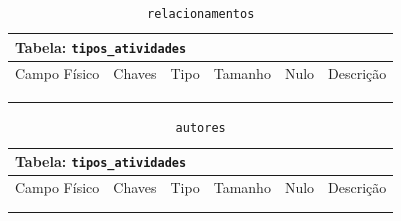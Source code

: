 \documentclass[12pt,a4paper]{article}
\begin{document}
\begin{center}
\begin{table}[h!]
	\caption{\texttt{relacionamentos}}
	\label{tabela:relacionamentos}
	\begin{tabular}{|p{2.5cm}|p{1cm}|p{1.25cm}|p{1.75cm}|p{1.25cm}|p{5cm}|}\hline	
		\multicolumn{6}{|p{16cm}|}{\cellcolor{cinzaClaro}  \centering Tabela: \texttt{tipos\_atividades}} \\ \hline %
		{\small Campo Físico}   & {\small Chaves} & {\small Tipo} & {\small Tamanho} & {\small Nulo} & {\small Descrição}\\\hline %
		
		{\tiny } & {\tiny } & {\tiny } & {\tiny } & {\tiny } &{\tiny }\\\hline
		{\tiny } & {\tiny } & {\tiny } & {\tiny } & {\tiny } &{\tiny }\\\hline
		{\tiny } & {\tiny } & {\tiny } & {\tiny } & {\tiny } &{\tiny }\\\hline
		
			
	\end{tabular}
\end{table}	
\end{center}

\begin{center}
\begin{table}[h!]
	\caption{\texttt{autores}}
	\label{tabela:autores}
	\begin{tabular}{|p{2.5cm}|p{1cm}|p{1.25cm}|p{1.75cm}|p{1.25cm}|p{5cm}|}\hline	
		\multicolumn{6}{|p{16cm}|}{\cellcolor{cinzaClaro}  \centering Tabela: \texttt{tipos\_atividades}} \\ \hline %
		{\small Campo Físico}   & {\small Chaves} & {\small Tipo} & {\small Tamanho} & {\small Nulo} & {\small Descrição}\\\hline %
		
		{\tiny } & {\tiny } & {\tiny } & {\tiny } & {\tiny } &{\tiny }\\\hline
		{\tiny } & {\tiny } & {\tiny } & {\tiny } & {\tiny } &{\tiny }\\\hline
			
	\end{tabular}
\end{table}	
\end{center}
\end{document}
